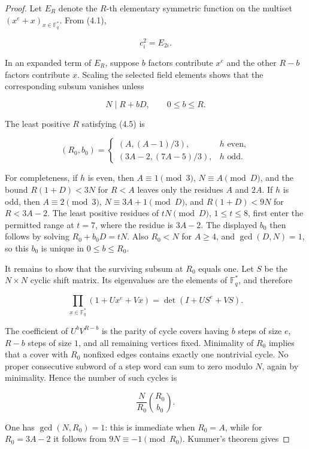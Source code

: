 \documentclass[11pt]{article}
\begin{document}
\begin{proof}

Let \(E_R\) denote the \(R\)-th elementary symmetric function on the multiset
\((x^e+x)_{x\in\mathbb F_q^*}\). From (4.1),

\[
c_i^2=E_{2i}.
\tag{4.4}
\]

In an expanded term of \(E_R\), suppose \(b\) factors contribute \(x^e\) and
the other \(R-b\) factors contribute \(x\). Scaling the selected field elements
shows that the corresponding subsum vanishes unless

\[
N\mid R+bD,\qquad 0\le b\le R.
\tag{4.5}
\]

The least positive \(R\) satisfying (4.5) is

\[
(R_0,b_0)=
\begin{cases}
\left(A,(A-1)/3\right),&h\text{ even},\\[4pt]
\left(3A-2,(7A-5)/3\right),&h\text{ odd}.
\end{cases}
\tag{4.6}
\]

For completeness, if \(h\) is even, then \(A\equiv1\pmod3\),
\(N\equiv A\pmod D\), and the bound \(R(1+D)<3N\) for \(R<A\) leaves only
the residues \(A\) and \(2A\). If \(h\) is odd, then \(A\equiv2\pmod3\),
\(N\equiv3A+1\pmod D\), and \(R(1+D)<9N\) for \(R<3A-2\). The least positive
residues of \(tN\pmod D\), \(1\le t\le8\), first enter the permitted range at
\(t=7\), where the residue is \(3A-2\). The displayed \(b_0\) then follows by
solving \(R_0+b_0D=tN\). Also \(R_0<N\) for \(A\ge4\), and
\(\gcd(D,N)=1\), so this \(b_0\) is unique in \(0\le b\le R_0\).

It remains to show that the surviving subsum at \(R_0\) equals one. Let \(S\)
be the \(N\times N\) cyclic shift matrix. Its eigenvalues are the elements of
\(\mathbb F_q^*\), and therefore

\[
\prod_{x\in\mathbb F_q^*}(1+Ux^e+Vx)
=\det(I+US^e+VS).
\tag{4.7}
\]

The coefficient of \(U^bV^{R-b}\) is the parity of cycle covers having \(b\)
steps of size \(e\), \(R-b\) steps of size \(1\), and all remaining vertices
fixed. Minimality of \(R_0\) implies that a cover with \(R_0\) nonfixed edges
contains exactly one nontrivial cycle. No proper consecutive subword of a step
word can sum to zero modulo \(N\), again by minimality. Hence the number of such
cycles is

\[
\frac{N}{R_0}\binom{R_0}{b_0}.
\tag{4.8}
\]

One has \(\gcd(N,R_0)=1\): this is immediate when \(R_0=A\), while for
\(R_0=3A-2\) it follows from \(9N\equiv-1\pmod{R_0}\). Kummer's theorem gives


\end{proof}
\end{document}
